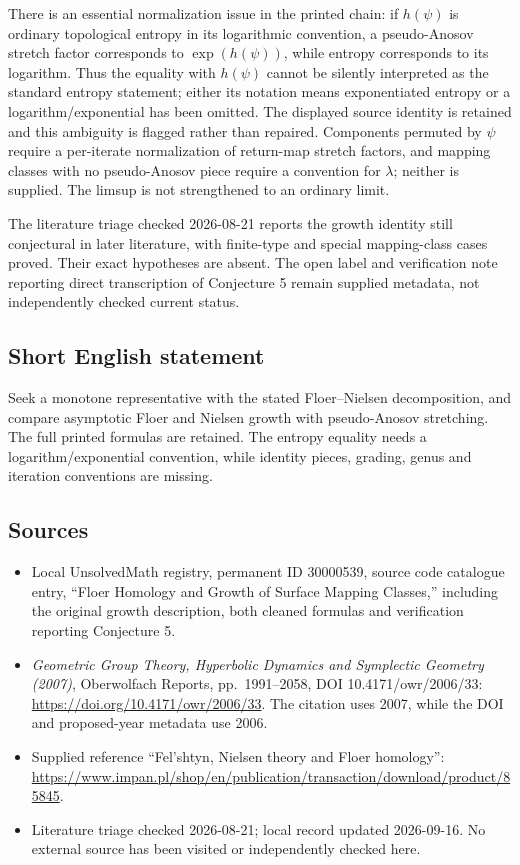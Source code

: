 \documentclass[11pt]{article}
\begin{document}
There is an essential normalization issue in the printed chain: if \(h(\psi)\) is ordinary topological entropy in its logarithmic convention, a pseudo-Anosov stretch factor corresponds to \(\exp(h(\psi))\), while entropy corresponds to its logarithm. Thus the equality with \(h(\psi)\) cannot be silently interpreted as the standard entropy statement; either its notation means exponentiated entropy or a logarithm/exponential has been omitted. The displayed source identity is retained and this ambiguity is flagged rather than repaired. Components permuted by \(\psi\) require a per-iterate normalization of return-map stretch factors, and mapping classes with no pseudo-Anosov piece require a convention for \(\lambda\); neither is supplied. The limsup is not strengthened to an ordinary limit.

The literature triage checked 2026-08-21 reports the growth identity still conjectural in later literature, with finite-type and special mapping-class cases proved. Their exact hypotheses are absent. The open label and verification note reporting direct transcription of Conjecture 5 remain supplied metadata, not independently checked current status.
\subsection{Short English statement}
Seek a monotone representative with the stated Floer--Nielsen decomposition, and compare asymptotic Floer and Nielsen growth with pseudo-Anosov stretching. The full printed formulas are retained. The entropy equality needs a logarithm/exponential convention, while identity pieces, grading, genus and iteration conventions are missing.
\subsection{Sources}
\begin{itemize}
\item Local UnsolvedMath registry, permanent ID 30000539, source code catalogue entry, ``Floer Homology and Growth of Surface Mapping Classes,'' including the original growth description, both cleaned formulas and verification reporting Conjecture 5.
\item \emph{Geometric Group Theory, Hyperbolic Dynamics and Symplectic Geometry (2007)}, Oberwolfach Reports, pp.\ 1991--2058, DOI 10.4171/owr/2006/33: \url{https://doi.org/10.4171/owr/2006/33}. The citation uses 2007, while the DOI and proposed-year metadata use 2006.
\item Supplied reference ``Fel'shtyn, Nielsen theory and Floer homology'': \url{https://www.impan.pl/shop/en/publication/transaction/download/product/85845}.
\item Literature triage checked 2026-08-21; local record updated 2026-09-16. No external source has been visited or independently checked here.
\end{itemize}
\end{document}
